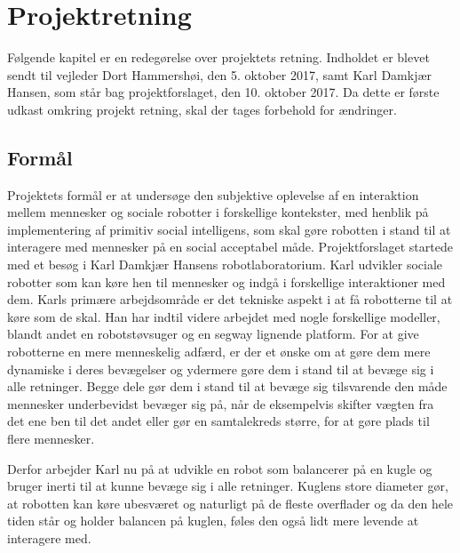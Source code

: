\chapter{Projektretning}
\label{ProjektRetning}
%
Følgende kapitel er en redegørelse over projektets retning. Indholdet er blevet sendt til vejleder Dort Hammershøi, den 5. oktober 2017, samt Karl Damkjær Hansen, som står bag projektforslaget, den 10. oktober 2017. Da dette er første udkast omkring projekt retning, skal der tages forbehold for ændringer.
%
\section{Formål}
\label{ProjektRetningFormaal}
%
Projektets formål er at undersøge den subjektive oplevelse af en interaktion mellem mennesker og sociale robotter i forskellige kontekster, med henblik på implementering af primitiv social intelligens, som skal gøre robotten i stand til at interagere med mennesker på en social acceptabel måde.\blankline
%
Projektforslaget startede med et besøg i Karl Damkjær Hansens robotlaboratorium. Karl udvikler sociale robotter som kan køre hen til mennesker og indgå i forskellige interaktioner med dem. Karls primære arbejdsområde er det tekniske aspekt i at få robotterne til at køre som de skal. Han har indtil videre arbejdet med nogle forskellige modeller, blandt andet en robotstøvsuger og en segway lignende platform. For at give robotterne en mere menneskelig adfærd, er der et ønske om at gøre dem mere dynamiske i deres bevægelser og ydermere gøre dem i stand til at bevæge sig i alle retninger. Begge dele gør dem i stand til at bevæge sig tilsvarende den måde mennesker underbevidst bevæger sig på, når de eksempelvis skifter vægten fra det ene ben til det andet eller gør en samtalekreds større, for at gøre plads til flere mennesker. 

Derfor arbejder Karl nu på at udvikle en robot som balancerer på en kugle og bruger inerti til at kunne bevæge sig i alle retninger. Kuglens store diameter gør, at robotten kan køre ubesværet og naturligt på de fleste overflader og da den hele tiden står og holder balancen på kuglen, føles den også lidt mere levende at interagere med.
%
